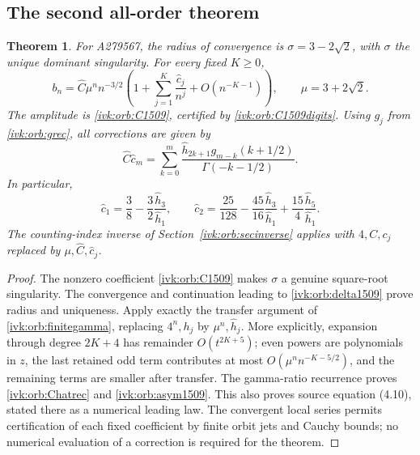 \documentclass[11pt,letterpaper]{article}
\newtheorem{theorem}{Theorem}[section]
\theoremstyle{remark}\newtheorem{remark}[theorem]{Remark}
\begin{document}
\subsection{The second all-order theorem}
\begin{theorem}\label{ivk:orb:main1509}
For A279567, the radius of convergence is $\sigma=3-2\sqrt2$,
with $\sigma$ the unique dominant singularity. For every fixed $K\ge0$,
\begin{equation}\label{ivk:orb:asym1509}
b_n=\widehat C\mu^n n^{-3/2}
\left(1+\sum_{j=1}^{K}\frac{\widehat c_j}{n^j}
+O(n^{-K-1})\right),\qquad \mu=3+2\sqrt2.
\end{equation}
The amplitude is \eqref{ivk:orb:C1509}, certified by \eqref{ivk:orb:C1509digits}.
Using $g_j$ from \eqref{ivk:orb:grec}, all corrections are given by
\begin{equation}\label{ivk:orb:Chatrec}
\widehat C\widehat c_m=\sum_{k=0}^{m}
\frac{\widehat h_{2k+1}g_{m-k}(k+1/2)}{\Gamma(-k-1/2)}.
\end{equation}
In particular,
\[
\widehat c_1=\frac38-\frac32\frac{\widehat h_3}{\widehat h_1},\qquad
\widehat c_2=\frac{25}{128}-\frac{45}{16}\frac{\widehat h_3}{\widehat h_1}
+\frac{15}{4}\frac{\widehat h_5}{\widehat h_1}.
\]
The counting-index inverse of Section~\ref{ivk:orb:secinverse} applies with
$4,C,c_j$ replaced by $\mu,\widehat C,\widehat c_j$.
\end{theorem}
\begin{proof}
The nonzero coefficient \eqref{ivk:orb:C1509} makes $\sigma$ a genuine
square-root singularity. The convergence and continuation leading to
\eqref{ivk:orb:delta1509} prove radius and uniqueness. Apply exactly the
transfer argument of \eqref{ivk:orb:finitegamma}, replacing $4^n,h_j$ by
$\mu^n,\widehat h_j$. More explicitly, expansion through degree
$2K+4$ has remainder $O(t^{2K+5})$; even powers are polynomials in
$z$, the last retained odd term contributes at most
$O(\mu^nn^{-K-5/2})$, and the remaining terms are smaller after
transfer. The gamma-ratio recurrence proves \eqref{ivk:orb:Chatrec} and
\eqref{ivk:orb:asym1509}. This also proves source equation (4.10), stated there
as a numerical leading law. The convergent local series permits
certification of each fixed coefficient by finite orbit jets and
Cauchy bounds; no numerical evaluation of a correction is required for
the theorem.
\end{proof}
\end{document}
